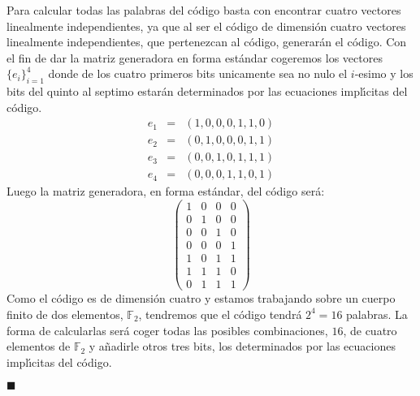 Para calcular todas las palabras del c\'odigo basta con encontrar cuatro
vectores linealmente independientes, ya que al ser el c\'odigo de dimensi\'on
cuatro vectores linealmente independientes, que pertenezcan al c\'odigo, 
generar\'an el c\'odigo. Con el fin de dar la matriz generadora en forma
est\'andar cogeremos los vectores $\{e_i\}_{i=1}^4$ donde de los cuatro
primeros bits unicamente sea no nulo el $i$-esimo y los bits del quinto al
septimo estar\'an determinados por las ecuaciones impl\'{\i}citas del c\'odigo.
\begin{eqnarray*}
e_1&=&(1,0,0,0,1,1,0)\\
e_2&=&(0,1,0,0,0,1,1)\\
e_3&=&(0,0,1,0,1,1,1)\\
e_4&=&(0,0,0,1,1,0,1)
\end{eqnarray*}
Luego la matriz generadora, en forma est\'andar, del c\'odigo ser\'a:
\begin{displaymath}
\left( \begin{array}{cccc}
1&0&0&0\\
0&1&0&0\\
0&0&1&0\\
0&0&0&1\\
1&0&1&1\\
1&1&1&0\\
0&1&1&1
\end{array} \right)
\end{displaymath}
Como el c\'odigo es de dimensi\'on cuatro y estamos trabajando sobre un
cuerpo finito de dos elementos, $\mathbb{F}_2$, tendremos que el c\'odigo
tendr\'a $2^4=16$ palabras. La forma de calcularlas ser\'a coger todas las
posibles combinaciones, $16$, de cuatro elementos de $\mathbb{F}_2$ y 
a\~nadirle otros tres bits, los determinados por las ecuaciones impl\'{\i}citas
del c\'odigo.

\begin{flushright}
$\blacksquare$
\end{flushright}

%
\newpage
%

%
%

